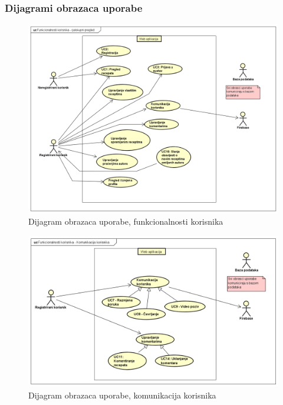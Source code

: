 				\eject
				\subsubsection{Dijagrami obrazaca uporabe}
				
				\begin{figure}[H]
					\includegraphics[scale= 0.42]{slike/UseCase Diagram0.png}
					\centering
					\caption{Dijagram obrazaca uporabe, funkcionalnosti korisnika}
					\label{fig:Dijagram obrazaca uporabe, funkcionalnosti korisnika}
				\end{figure}
				\eject
				\begin{figure}[H]
					\includegraphics[scale= 0.42]{slike/UseCase Diagram1.png}
					\centering
					\caption{Dijagram obrazaca uporabe, komunikacija korisnika}
					\label{fig:Dijagram obrazaca uporabe, komunikacija korisnika}
				\end{figure}
